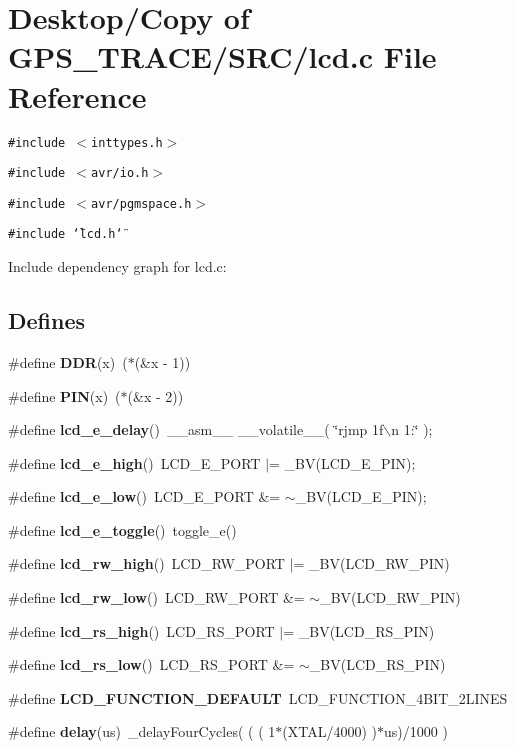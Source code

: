 \section{Desktop/Copy of GPS\_\-TRACE/SRC/lcd.c File Reference}
\label{lcd_8c}
{\tt \#include $<$inttypes.h$>$}\par
{\tt \#include $<$avr/io.h$>$}\par
{\tt \#include $<$avr/pgmspace.h$>$}\par
{\tt \#include \char`\"{}lcd.h\char`\"{}}\par


Include dependency graph for lcd.c:\subsection*{Defines}
\begin{CompactItemize}
\item 
\#define {\bf DDR}(x)~($\ast$(\&x - 1))
\item 
\#define {\bf PIN}(x)~($\ast$(\&x - 2))
\item 
\#define {\bf lcd\_\-e\_\-delay}()~\_\-\_\-asm\_\-\_\- \_\-\_\-volatile\_\-\_\-( \char`\"{}rjmp 1f$\backslash$n 1:\char`\"{} );
\item 
\#define {\bf lcd\_\-e\_\-high}()~LCD\_\-E\_\-PORT  $|$=  \_\-BV(LCD\_\-E\_\-PIN);
\item 
\#define {\bf lcd\_\-e\_\-low}()~LCD\_\-E\_\-PORT  \&= $\sim$\_\-BV(LCD\_\-E\_\-PIN);
\item 
\#define {\bf lcd\_\-e\_\-toggle}()~toggle\_\-e()
\item 
\#define {\bf lcd\_\-rw\_\-high}()~LCD\_\-RW\_\-PORT $|$=  \_\-BV(LCD\_\-RW\_\-PIN)
\item 
\#define {\bf lcd\_\-rw\_\-low}()~LCD\_\-RW\_\-PORT \&= $\sim$\_\-BV(LCD\_\-RW\_\-PIN)
\item 
\#define {\bf lcd\_\-rs\_\-high}()~LCD\_\-RS\_\-PORT $|$=  \_\-BV(LCD\_\-RS\_\-PIN)
\item 
\#define {\bf lcd\_\-rs\_\-low}()~LCD\_\-RS\_\-PORT \&= $\sim$\_\-BV(LCD\_\-RS\_\-PIN)
\item 
\#define {\bf LCD\_\-FUNCTION\_\-DEFAULT}~LCD\_\-FUNCTION\_\-4BIT\_\-2LINES
\item 
\#define {\bf delay}(us)~\_\-delayFourCycles( ( ( 1$\ast$(XTAL/4000) )$\ast$us)/1000 )
\end{CompactItemize}
